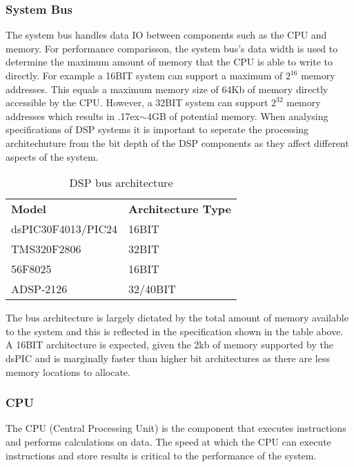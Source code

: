 \documentclass[titlepage]{scrartcl}
\begin{document}
    \subsubsection{System Bus}
    The system bus handles data IO between components such as the CPU
    and memory. For performance comparisson, the system bus's data width is
    used to determine the maximum amount of memory that the CPU is able to
    write to directly. 
    For example a 16BIT system can support a maximum of $2^{16}$ memory
    addresses. This equals a maximum memory size of 64Kb of memory directly
    accessible by the CPU. However, a 32BIT system can support $2^{32}$ memory
    addresses which results in {\raise.17ex\hbox{$\scriptstyle\mathtt{\sim}$}}4GB of potential memory.
    When analysing specifications of DSP systems it is important to seperate
    the processing architechuture from the bit depth of the DSP components as
    they affect different aspects of the system.

    \begin{table}[H]
    \centering
    \caption{DSP bus architecture}
    \label{my-label}
    \begin{tabular}{ll}
        \textbf{Model}     & \textbf{Architecture Type}\\
        dsPIC30F4013/PIC24 & 16BIT      \\
        TMS320F2806        & 32BIT     \\
        56F8025            & 16BIT      \\
        ADSP-2126          & 32/40BIT
    \end{tabular}
    \end{table}

    The bus architecture is largely dictated by the total amount of memory
    available to the system and this is reflected in the specification shown in
    the table above. A 16BIT architecture is expected, given the 2kb of memory
    supported by the dsPIC and is marginally faster than higher bit
    architectures as there are less memory locations to allocate. 

    \subsubsection{CPU}\label{CPU}
    The CPU (Central Processing Unit) is the component that executes
    instructions and performs calculations on data. The speed at which the CPU
    can execute instructions and store results is critical to the performance
    of the system.
\end{document}
